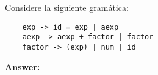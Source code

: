 Considere la siguiente gramática:

    \begin{verbatim}
    exp -> id = exp | aexp
    aexp -> aexp + factor | factor
    factor -> (exp) | num | id
    \end{verbatim}

\textbf{Answer:}